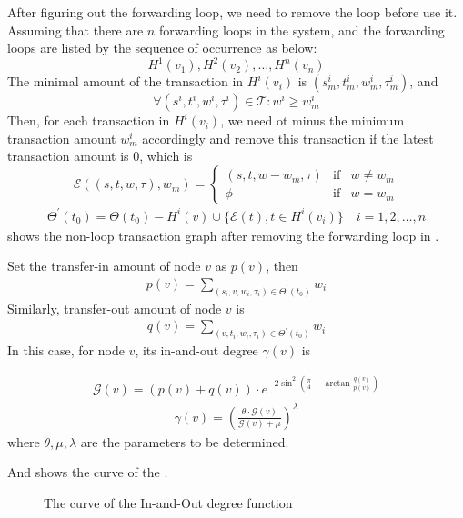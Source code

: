


After figuring out the forwarding loop, we need to remove the loop before use it. Assuming that there are $n$ forwarding loops in the system, and the forwarding loops are listed by the sequence of occurrence as below:
\[
H^1(v_1), H^2(v_2), \dots, H^n(v_n)\]
\noindent The minimal amount of the transaction in $H^i(v_i)$ is $(s^i_m, t^i_m, w^i_m, \tau^i_m)$, and
\[
\forall (s^i, t^i, w^i, \tau^i) \in \mathcal{T} : w^i \ge w^i_m
\]
\noindent Then, for each transaction in $H^i(v_i)$, we need ot minus the minimum transaction amount $w^i_m$ accordingly and remove this transaction if the latest transaction amount is 0, which is
\[
\mathcal{E}((s, t, w, \tau), w_m) = \left\{ \begin{array}{rcl}
(s, t, w-w_m, \tau) & \mbox{if} & w \ne w_m \\
\phi & \mbox{if} & w = w_m
\end{array}\right.
\]
\begin{align}
\Theta^{\prime}(t_0)=\Theta(t_0)-H^i(v) \cup \{\mathcal{E}(t), t\in H^i(v_i)\} \quad i = 1, 2,\dots, n
\end{align}
\noindent {} shows the non-loop transaction graph after removing the forwarding loop in .


Set the transfer-in amount of node $v$ as $p(v)$, then
\begin{align}
\label{eq:dgr_func}
p(v) = \sum_{(s_i, v, w_i, \tau_i) \in \Theta^{\prime}(t_0)}{w_i}
\end{align}
\noindent Similarly, transfer-out amount of node $v$ is
\begin{align}
q(v) = \sum_{(v, t_i, w_i, \tau_i) \in \Theta^{\prime}(t_0)}{w_i}
\end{align}
\noindent In this case,
for node $v$, its in-and-out degree $\gamma(v)$ is

\begin{align}
\mathcal{G}(v) = (p(v) + q(v)) \cdot e^{-2\sin^2{(\frac{\pi}{4} - \arctan\frac{q(v)}{p(v)})}}
\end{align}
\begin{align}
\gamma(v) = (\frac{\theta\cdot \mathcal{G}(v)}{\mathcal{G}(v) + \mu})^{\lambda}
\end{align}
\noindent where $\theta, \mu, \lambda$ are the parameters to be determined.


And  shows the curve of the .
\begin{figure}
  \centering
  
\caption{The curve of the In-and-Out degree function \label{fig-surf}}
\end{figure}

